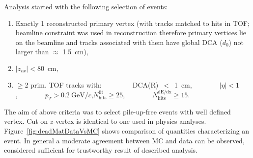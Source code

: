 Analysis started with the following selection of events:\vspace{-5pt}
\begin{enumerate}
 \item Exactly 1 reconstructed primary vertex (with tracks matched to hits in TOF; beamline constraint was used in reconstruction therefore primary vertices lie on the beamline and tracks associated with them have global DCA ($d_{0}$) not larger than $\approx$ 1.5~cm),\vspace{-5pt}
 \item $|z_{vx}|<80$~cm\vspace{-5pt},
 \item $\geq$2 prim. TOF tracks with:~~~~~~~~~DCA(R)~$<$~1~cm,~~~~~~~~$|\eta|<1$,~~~~~~~~$p_{T}>0.2~\text{GeV}/c$,\newline\hspace*{150pt}$N_{\textrm{hits}}^{\textrm{fit}}\geq25$,~~~~~~~~$N_{\textrm{hits}}^{\textrm{dE/dx}}\geq15$.%
\end{enumerate}%
The aim of above criteria was to select pile-up-free events with well defined vertex. Cut on $z$-vertex is identical to one used in physics analyses. Figure~\ref{fig:deadMatDataVsMC} shows comparison of quantities characterizing an event. In general a moderate agreement between MC and data can be observed, considered sufficient for trustworthy result of described analysis.
